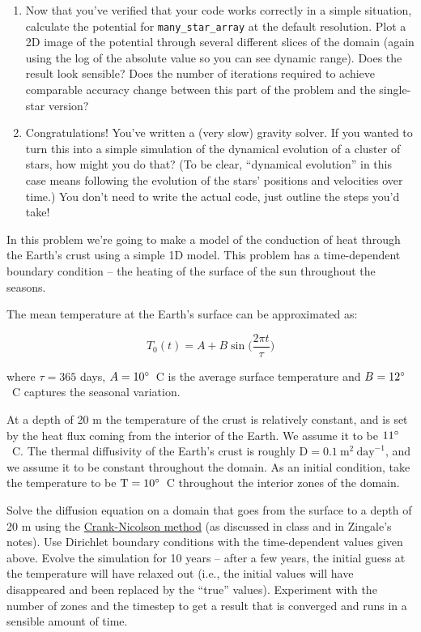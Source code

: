 \documentclass[10pt]{article}
\begin{document}
\begin{enumerate}
\item Now that you've verified that your code works correctly in a
simple situation, calculate the potential for
\texttt{many\_star\_array} at the default resolution.  Plot a 2D image of the potential through
several different slices of the domain (again using the log of the
absolute value so you can see dynamic range).  Does the result look
sensible?  Does the number of iterations required to achieve
comparable accuracy change between this part of the problem and the
single-star version?

\item Congratulations!  You've written a (very slow) gravity solver.  If you wanted
  to turn this into a simple simulation of the dynamical evolution of a cluster
  of stars, how might you do that?  (To be clear, ``dynamical
  evolution'' in this case means following the evolution of the stars'
  positions and velocities over time.)  You don't need to write the actual
  code, just outline the steps you'd take!

\end{enumerate}

\newpage
  In this problem we're going to
make a model of the conduction of heat through the Earth's crust using
a simple 1D model.  This problem has a time-dependent boundary condition --
the heating of the surface of the sun throughout the seasons.  

The mean temperature at the Earth's surface can be approximated as:

\begin{equation}
T_0(t) = A + B\sin\Big(\frac{2 \pi t}{\tau}\Big)
\end{equation}

where $\tau = 365$ days, $A = 10\degree$~C is the average surface temperature
and $B = 12\degree$~C captures the seasonal variation.

At a depth of 20 m the temperature of the crust is relatively
constant, and is set by the heat flux coming from the interior of the
Earth.  We assume it to be $11\degree$~C. The thermal diffusivity of
the Earth's crust is roughly $\mathrm{D} = 0.1~\mathrm{m}^2~\mathrm{day}^{-1}$,
and we assume it to be constant throughout the domain.  As an initial
condition, take the temperature to be $\mathrm{T} = 10\degree$~C throughout the
interior zones of the domain.

Solve the diffusion equation on a domain that goes from the surface to
a depth of 20 m using the
\href{https://en.wikipedia.org/wiki/Crank\%E2\%80\%93Nicolson_method}{Crank-Nicolson
  method} (as discussed in class and in Zingale's notes).  Use
Dirichlet boundary conditions with the time-dependent values given
above.  Evolve the simulation for 10 years -- after a few years, the
initial guess at the temperature will have relaxed out (i.e., the
initial values will
have disappeared and been replaced by the ``true'' values).
Experiment with the number of zones and the timestep to get a result
that is converged and runs in a sensible amount of time.
\end{document}
